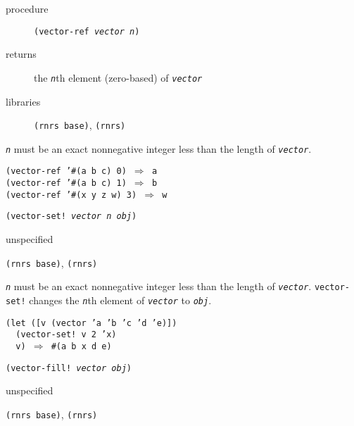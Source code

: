 \begin{description}

\label{objects_s234}\item[procedure] \texttt{(vector-ref \textit{vector} \textit{n})}



\item[returns] the \texttt{\textit{n}}th element (zero-based) of \texttt{\textit{vector}}


\item[libraries] \texttt{(rnrs base)}, \texttt{(rnrs)}
\end{description}

\texttt{\textit{n}} must be an exact nonnegative integer less than
the length of \texttt{\textit{vector}}.

\begin{alltt}
(vector-ref '\#{}(a b c) 0) \(\Rightarrow\) a
(vector-ref '\#{}(a b c) 1) \(\Rightarrow\) b
(vector-ref '\#{}(x y z w) 3) \(\Rightarrow\) w
\end{alltt}

\begin{description}

\label{objects_s235}\item[procedure] \texttt{(vector-set! \textit{vector} \textit{n} \textit{obj})}



\item[returns] unspecified


\item[libraries] \texttt{(rnrs base)}, \texttt{(rnrs)}
\end{description}

\texttt{\textit{n}} must be an exact nonnegative integer less than
the length of \texttt{\textit{vector}}.
\texttt{vector-set!} changes the \texttt{\textit{n}}th element of \texttt{\textit{vector}} to \texttt{\textit{obj}}.

\begin{alltt}
(let ([v (vector 'a 'b 'c 'd 'e)])
  (vector-set! v 2 'x)
  v) \(\Rightarrow\) \#{}(a b x d e)
\end{alltt}

\begin{description}

\label{objects_s236}\item[procedure] \texttt{(vector-fill! \textit{vector} \textit{obj})}



\item[returns] unspecified


\item[libraries] \texttt{(rnrs base)}, \texttt{(rnrs)}
\end{description}


